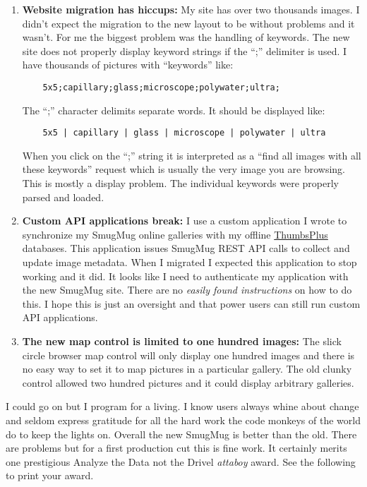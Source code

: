 \begin{enumerate}
\item
  \textbf{Website migration has hiccups:} My site has over two thousands
  images. I didn't expect the migration to the new layout to be without
  problems and it wasn't. For me the biggest problem was the handling of
  keywords. The new site does not properly display keyword strings if
  the ``;'' delimiter is used. I have thousands of pictures with
  ``keywords'' like:

\begin{verbatim}
    5x5;capillary;glass;microscope;polywater;ultra;
\end{verbatim}

  The ``;'' character delimits separate words. It should be displayed
  like:

\begin{verbatim}
    5x5 | capillary | glass | microscope | polywater | ultra
\end{verbatim}

  When you click on the ``;'' string it is interpreted as a ``find all
  images with all these keywords'' request which is usually the very
  image you are browsing. This is mostly a display problem. The
  individual keywords were properly parsed and loaded.
\item
  \textbf{Custom API applications break:} I use a custom application I
  wrote to synchronize my SmugMug online galleries with my offline
  \href{http://www.cerious.com/}{ThumbsPlus} databases. This application
  issues SmugMug REST API calls to collect and update image metadata.
  When I migrated I expected this application to stop working and it
  did. It looks like I need to authenticate my application with the new
  SmugMug site. There are no \emph{easily found instructions} on how to
  do this. I hope this is just an oversight and that power users can
  still run custom API applications.
\item
  \textbf{The new map control is limited to one hundred images:} The
  slick circle browser map control will only display one hundred images
  and there is no easy way to set it to map pictures in a particular
  gallery. The old clunky control allowed two hundred pictures and it
  could display arbitrary galleries.
\end{enumerate}

I could go on but I program for a living. I know users always whine
about change and seldom express gratitude for all the hard work the code
monkeys of the world do to keep the lights on. Overall the new SmugMug
is better than the old. There are problems but for a first production
cut this is fine work. It certainly merits one prestigious Analyze the
Data not the Drivel \emph{attaboy} award. See the following to print
your award.



